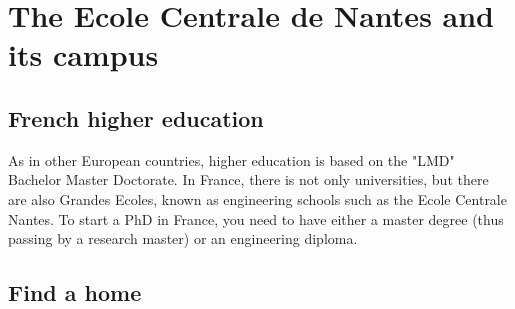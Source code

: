 \chapter{The Ecole Centrale de Nantes and its campus}

\section{French higher education}


As in other European countries, higher education is based on the "LMD" Bachelor Master Doctorate.
In France, there is not only universities, but there are also Grandes Ecoles, known as engineering schools such as the Ecole Centrale Nantes.
To start a PhD in France, you need to have either a master degree (thus passing by a research master) or an engineering diploma.



\section{Find a home}
